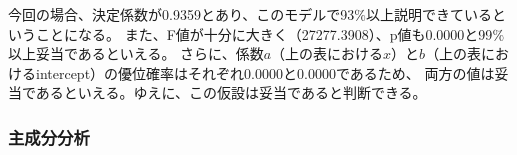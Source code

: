 \documentclass[a4paper,xelatex,ja=standard,jafont=hiragino-pron, 10pt]{bxjsarticle}
\begin{document}
今回の場合、決定係数が0.9359とあり、このモデルで93$\%$以上説明できているということになる。
また、F値が十分に大きく（27277.3908）、p値も0.0000と99$\%$以上妥当であるといえる。
さらに、係数$a$（上の表における$x$）と$b$（上の表におけるintercept）の優位確率はそれぞれ0.0000と0.0000であるため、
両方の値は妥当であるといえる。ゆえに、この仮設は妥当であると判断できる。

\subsubsection{主成分分析}
\end{document}
